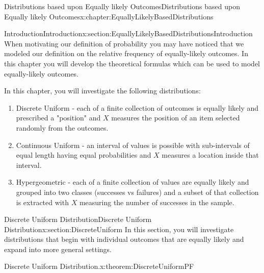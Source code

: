 \documentclass[oneside,10pt,]{book}
\numberwithin{equation}{section}
\begin{document}
%
%
\typeout{************************************************}
\typeout{************************************************}
%
\begin{chapterptx}{Distributions based upon Equally likely Outcomes}{}{Distributions based upon Equally likely Outcomes}{}{}{x:chapter:EquallyLikelyBasedDistributions}
%
%
\typeout{************************************************}
\typeout{************************************************}
%
\begin{sectionptx}{Introduction}{}{Introduction}{}{}{x:section:EquallyLikelyBasedDistributionsIntroduction}
When motivating our definition of probability you may have noticed that we modeled our definition on the relative frequency of equally-likely outcomes. In this chapter you will develop the theoretical formulas which can be used to model equally-likely outcomes.%
\par
In this chapter, you will investigate the following distributions:%
\begin{enumerate}
\item{}Discrete Uniform - each of a finite collection of outcomes is equally likely and prescribed a "position" and \(X\) measures the position of an item selected randomly from the outcomes.%
\item{}Continuous Uniform - an interval of values is possible with sub-intervals of equal length having equal probabilities and \(X\) measures a location inside that interval.%
\item{}Hypergeometric - each of a finite collection of values are equally likely and grouped into two classes (successes vs failures) and a subset of that collection is extracted with \(X\) measuring the number of successes in the sample.%
\end{enumerate}
%
\end{sectionptx}
%
%
\typeout{************************************************}
\typeout{************************************************}
%
\begin{sectionptx}{Discrete Uniform Distribution}{}{Discrete Uniform Distribution}{}{}{x:section:DiscreteUniform}
In this section, you will investigate distributions that begin with individual outcomes that are equally likely and expand into more general settings.%
\par
\begin{theorem}{Discrete Uniform Distribution.}{}{x:theorem:DiscreteUniformPF}%

\end{theorem}
\end{sectionptx}
\end{chapterptx}
\end{document}

